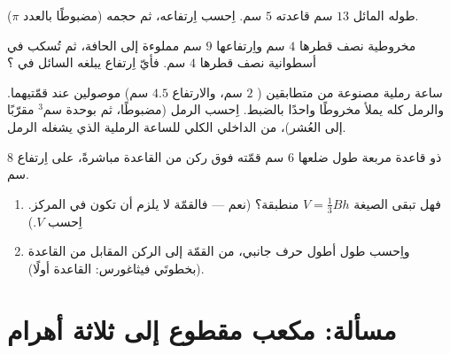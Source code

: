 \begin{exercise}[$\star\star$]\label{exo:g8:solids:8}
 طوله المائل $13$ سم  قاعدته $5$ سم. اِحسب
اِرتفاعه، ثم حجمه (مضبوطًا بالعدد $\pi$).
\end{exercise}

\begin{exercise}[$\star\star$]\label{exo:g8:solids:9}
 مخروطية نصف قطرها $4$ سم واِرتفاعها $9$ سم مملوءة إلى
الحافة، ثم تُسكب في  أسطوانية نصف قطرها $4$ سم. فأيّ
اِرتفاع يبلغه السائل في ؟
\end{exercise}

\begin{exercise}[$\star\star$]\label{exo:g8:solids:10}
ساعة رملية مصنوعة من  متطابقين ( $2$ سم، والارتفاع
$4.5$ سم) موصولين عند قمّتيهما. والرمل كله يملأ مخروطًا
واحدًا بالضبط. اِحسب  الرمل (مضبوطًا، ثم بوحدة سم$^3$ مقرّبًا إلى
العُشر)،  من  الداخلي الكلي للساعة الرملية
الذي يشغله الرمل.
\end{exercise}

\begin{exercise}[$\star\star\star$]\label{exo:g8:solids:11}
 ذو قاعدة مربعة طول ضلعها $6$ سم قمّته فوق
ركن من القاعدة مباشرةً، على اِرتفاع $8$ سم.
\begin{enumerate}
  \item فهل تبقى الصيغة $V = \frac13 Bh$ منطبقة؟ (نعم ---
        فالقمّة لا يلزم أن تكون في المركز. اِحسب $V$.)
  \item واِحسب طول أطول حرف جانبي، من القمّة
        إلى الركن المقابل من القاعدة (بخطوتَي فيثاغورس:
         القاعدة أولًا).
\end{enumerate}
\end{exercise}

\section{مسألة: مكعب مقطوع إلى ثلاثة أهرام}

